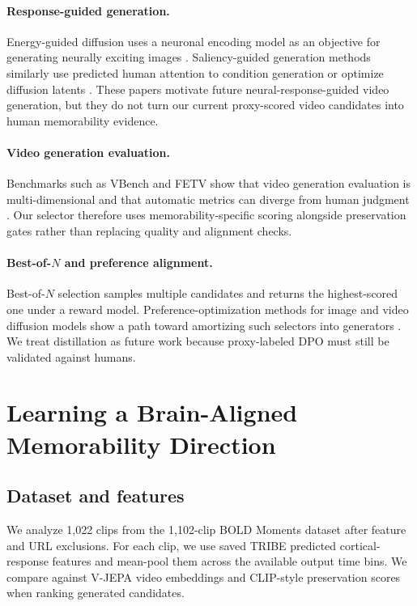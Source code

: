 \documentclass[11pt]{article}
\begin{document}
\paragraph{Response-guided generation.}
Energy-guided diffusion uses a neuronal encoding model as an objective for
generating neurally exciting images \citep{pierzchlewicz2023energyguided}.
Saliency-guided generation methods similarly use predicted human attention to
condition generation or optimize diffusion latents
\citep{zhang2025gazefusion,wang2024sgool}. These papers motivate future
neural-response-guided video generation, but they do not turn our current
proxy-scored video candidates into human memorability evidence.

\paragraph{Video generation evaluation.}
Benchmarks such as VBench and FETV show that video generation evaluation is
multi-dimensional and that automatic metrics can diverge from human judgment
\citep{huang2023vbench,liu2023fetv}. Our selector therefore uses
memorability-specific scoring alongside preservation gates rather than replacing
quality and alignment checks.

\paragraph{Best-of-$N$ and preference alignment.}
Best-of-$N$ selection samples multiple candidates and returns the highest-scored
one under a reward model. Preference-optimization methods for image and video
diffusion models show a path toward amortizing such selectors into generators
\citep{wallace2023diffusiondpo,liu2024videodpo,wub2025densedpo}. We treat
distillation as future work because proxy-labeled DPO must still be validated
against humans.

\section{Learning a Brain-Aligned Memorability Direction}

\subsection{Dataset and features}

We analyze 1,022 clips from the 1,102-clip BOLD Moments dataset after feature and
URL exclusions. For each clip, we use saved TRIBE predicted cortical-response
features and mean-pool them across the available output time bins. We compare
against V-JEPA video embeddings and CLIP-style preservation scores when ranking
generated candidates.
\end{document}
